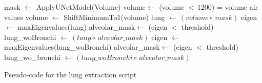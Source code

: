 \documentclass{standalone}
\begin{document}
	
	\begin{algorithm}
		
		\SetAlgoLined
		\DontPrintSemicolon
		

		\;
		
		mask $\leftarrow$ ApplyUNetModel(Volume)\;
		volume$\leftarrow$ (volume $<\,1200$) = volume air values\;
		volume $\leftarrow$ ShiftMinimumTo1(volume)\;
		lung $\leftarrow\,(volume\circ\, mask)$	\;
		\;
		eigen $\leftarrow$ maxEigenvalues(lung)\;
		alveolar\_mask$\leftarrow$ (eigen $<$ threshold)\;
		lung\_woBronchi $\leftarrow\,(lung\circ\, alveolar\_mask)$\; 
		\;
		eigen $\leftarrow$ maxEigenvalues(lung\_woBronchi)\;
		alveolar\_mask$\leftarrow$ (eigen $<$ threshold)
		lung\_wo\_bronchi $\leftarrow\,(lung\_woBronchi\circ\, alveolar\_mask)$\; 		
		
	\caption{Pseudo-code for the lung extraction script}	\label{alg:lungExtraction}
		
	\end{algorithm}
	
\end{document}
